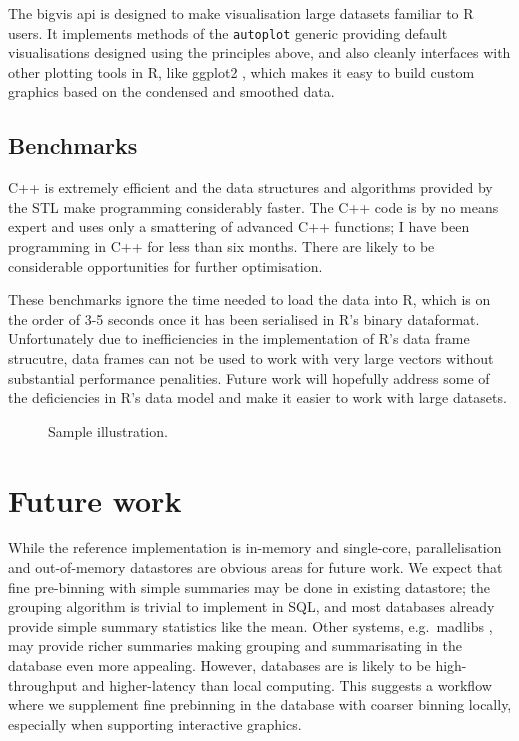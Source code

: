 \documentclass[journal]{vgtc}                %
\begin{document}
The bigvis {\sc api} is designed to make visualisation large datasets familiar to R users. It implements methods of the {\tt autoplot} generic providing default visualisations designed using the principles above, and also cleanly interfaces with other plotting tools in R, like ggplot2 \citep{me:ggplot2,wickham:2007d}, which makes it easy to build custom graphics based on the condensed and smoothed data.

\subsection{Benchmarks}
\label{sub:benchmarks}

C++ is extremely efficient and the data structures and algorithms provided by the STL make programming considerably faster.  The C++ code is by no means expert and uses only a smattering of advanced C++ functions; I have been programming in C++ for less than six months. There are likely to be considerable opportunities for further optimisation.

These benchmarks ignore the time needed to load the data into R, which is on the order of 3-5 seconds once it has been serialised in R's binary dataformat.  Unfortunately due to inefficiencies in the implementation of R's data frame strucutre, data frames can not be used to work with very large vectors without substantial performance penalities. Future work will hopefully address some of the deficiencies in R's data model and make it easier to work with large datasets.


\begin{figure}[htb]
 \centering
 \caption{Sample illustration.}
\end{figure}

\section{Future work}
\label{sec:conclusion}

While the reference implementation is in-memory and single-core, parallelisation and out-of-memory datastores are obvious areas for future work. We expect that fine pre-binning with simple summaries may be done in existing datastore; the grouping algorithm is trivial to implement in SQL, and most databases already provide simple summary statistics like the mean. Other systems, e.g.\ madlibs \citep{hellerstein:2012}, may provide richer summaries making grouping and summarisating in the database even more appealing. However, databases are is likely to be high-throughput and higher-latency than local computing. This suggests a workflow where we supplement fine prebinning in the database with coarser binning locally, especially when supporting interactive graphics.
\end{document}
